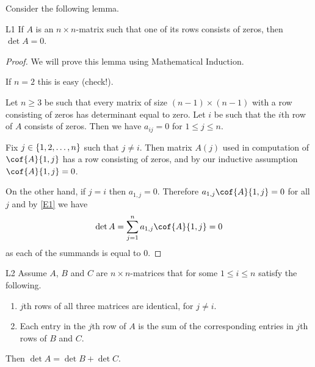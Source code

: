 Consider the following lemma.

\begin{lemma}{}{L1} 
If $A$ is an $n\times n$-matrix such that one of its rows consists of zeros, then 
$\det A=0$. 
\end{lemma} 

\begin{proof} 
We will prove this lemma using Mathematical Induction. 

If $n=2$ this is easy (check!). 

Let $n\geq 3$ be such that every matrix of size $(n-1)\times(n-1)$ with a row consisting of zeros
has determinant equal to zero.  
Let $i$ be such that the $i$th row of $A$ consists of zeros. 
Then we have $a_{ij}=0$ for $1\leq j\leq n$. 

Fix $j\in \left\{1,2, \dots ,n\right\}$ such that $j\neq i$. Then  matrix $A(j)$ used in computation of
 $\cof{A}{1,j}$ has a row consisting of zeros, and by our inductive 
 assumption $\cof{A}{1,j}=0$. 

On the other hand, if $j=i$ then $a_{1,j}=0$.  
Therefore $a_{1,j}\cof{A}{1,j}=0$ for all $j$ and by \eqref{E1} we have 
\[
\det A=\sum_{j=1}^n a_{1,j} \cof{A}{1,j}=0
\]
as each of the summands is equal to 0. 
\end{proof} 

\begin{lemma}{}{L2} 
Assume $A$, $B$ and $C$ are $n\times n$-matrices that for some 
 $1\leq i\leq n$ satisfy the following. 
\begin{enumerate}
\item $j$th rows of all three matrices are identical, for $j\neq i$. 

\item Each entry in the $j$th row of $A$ is the sum of the corresponding 
entries in $j$th rows of $B$ and $C$. 
\end{enumerate}

Then $\det A=\det B+\det C$. 
\end{lemma} 


